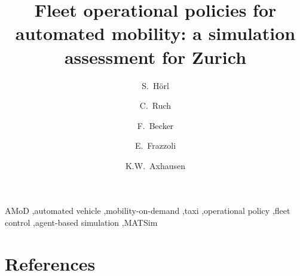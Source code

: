 \documentclass[preprint]{elsarticle}
\begin{document}
    \begin{frontmatter}
        \title{Fleet operational policies for automated mobility: a simulation assessment for Zurich}
        \author[ivt]{S.~H\"orl}
        \author[idsc]{C.~Ruch}
        \author[ivt]{F.~Becker}
        \author[idsc]{E.~Frazzoli}
        \author[ivt]{K.W.~Axhausen}
        \address[ivt]{Institute for Transport Planning and Systems, ETH Zurich}
        \address[idsc]{Institute for Dynamic Systems and Control, ETH Zurich}
        \begin{abstract}
            
        \end{abstract}
        \begin{keyword}
            AMoD \sep automated vehicle \sep mobility-on-demand \sep taxi \sep operational policy \sep fleet control \sep agent-based simulation \sep MATSim
        \end{keyword}
    \end{frontmatter}
    \linenumbers
    
    
    
    
    
    
    
    \section*{References}
    
\end{document}
